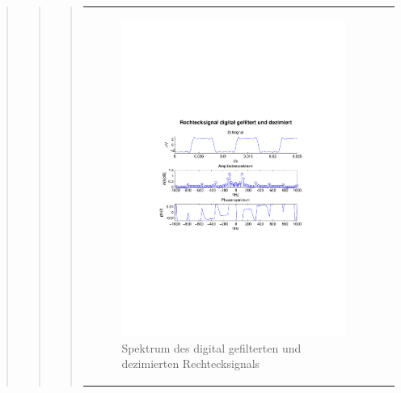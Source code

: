 \begin{quote}
\begin{quote}
\begin{quote}
\begin{center}
\begin{tabular}{ll}
\begin{minipage}{0.6\textwidth}
                        \begin{figure}[H]
                            \label{fig:}
                            \includegraphics[scale=0.65, trim = 3cm 9cm 3cm
                            8.5cm, clip]{./Bilder/rechteck15kHz_digifilt+dezi}
                            \caption{Spektrum des digital
                            gefilterten und dezimierten Rechtecksignals}
                        \end{figure}
                    \vspace{-1.5em}
    
                    \end{minipage}
    
                \end{tabular}
                \end{center}
    			    	

\end{quote}
\end{quote}
\end{quote}
